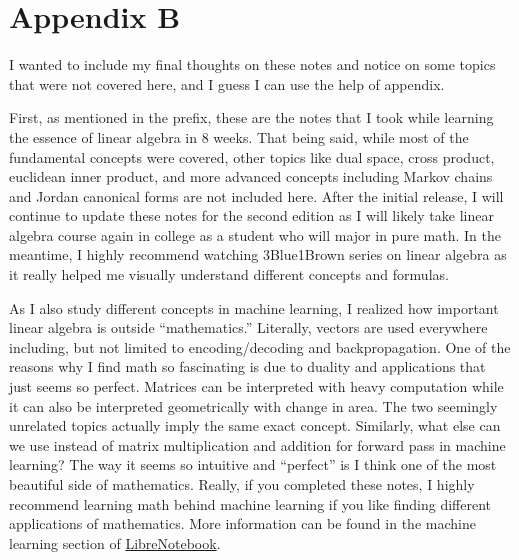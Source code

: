 \documentclass[../main.tex]{subfiles}
\begin{document}
\chapter{Appendix B}

I wanted to include my final thoughts on these notes and notice on
some topics that were not covered here, and I guess I can use the
help of appendix.

First, as mentioned in the prefix, these are the notes that I took
while learning the essence of linear algebra in 8 weeks. That being
said, while most of the fundamental concepts were covered, other
topics like dual space, cross product, euclidean inner product,
and more advanced concepts including Markov chains and Jordan
canonical forms are not included here. After the initial release,
I will continue to update these notes for the second edition as I will
likely take linear algebra course again in college as a student who
will major in pure math. In the meantime, I highly recommend watching
3Blue1Brown series on linear algebra as it really helped me visually
understand different concepts and formulas.

As I also study different concepts in machine learning, I realized
how important linear algebra is outside ``mathematics.'' Literally,
vectors are used everywhere including, but not limited to
encoding/decoding and backpropagation. One of the reasons why I
find math so fascinating is due to duality and applications that
just seems so perfect. Matrices can be interpreted with heavy
computation while it can also be interpreted geometrically with
change in area. The two seemingly unrelated topics actually imply
the same exact concept. Similarly, what else can we use instead of
matrix multiplication and addition for forward pass in machine
learning? The way it seems so intuitive and ``perfect'' is I think one
of the most beautiful side of mathematics. Really, if you completed
these notes, I highly recommend learning math behind machine learning
if you like finding different applications of mathematics. More
information can be found in the machine learning section of
\href{https://github.com/enochyu-official/LibreNotebook}{LibreNotebook}.
\end{document}
